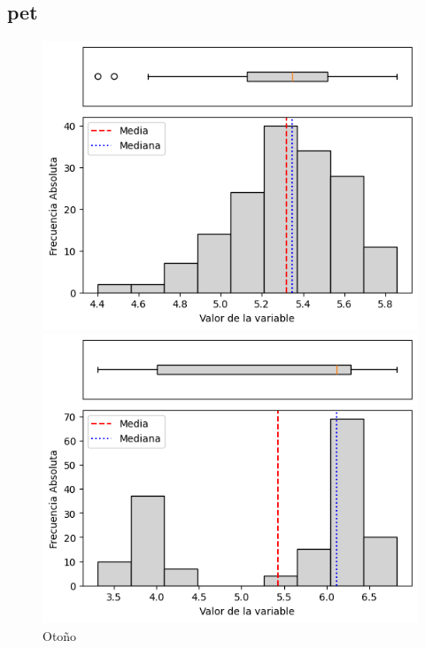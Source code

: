 \subsection{\gls{pet} }

\begin{figure}[htbp]
\centering
\begin{minipage}{0.30\textwidth}
    \centering
    \includegraphics[width=\linewidth]{resultados/por_estacion_del_anio/Ancachuro/PET_HistBoxplot_Autumn.png}
    \caption*{Otoño}
\end{minipage}
\hfill
\begin{minipage}{0.30\textwidth}
    \centering
    \includegraphics[width=\linewidth]{resultados/por_estacion_del_anio/Ancachuro/PET_HistBoxplot_Spring.png}

\end{minipage}
\end{figure}
